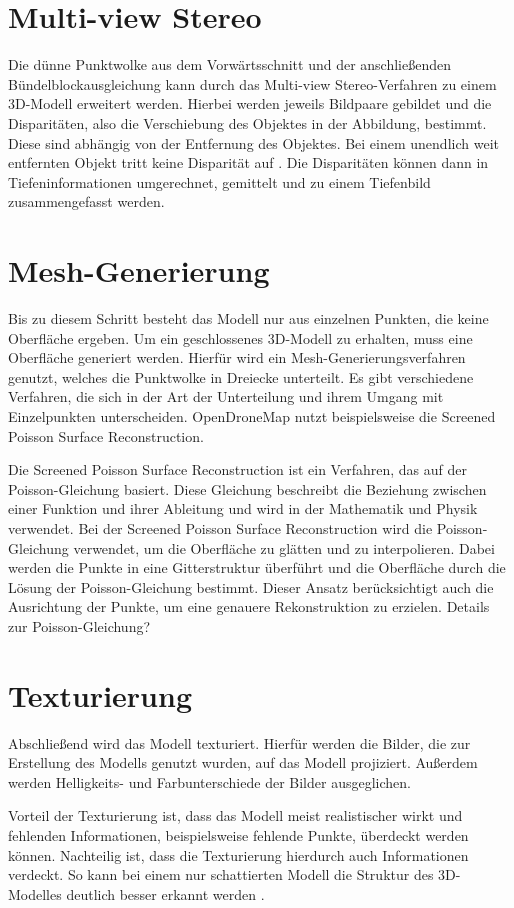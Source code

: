 \documentclass[./00PhotoBox.tex]{subfiles}
\begin{document}
\section{Multi-view Stereo}
Die dünne Punktwolke aus dem Vorwärtsschnitt und der anschließenden Bündel\-block\-ausgleichung kann durch das Multi-view Stereo-Verfahren zu einem 3D-Modell erweitert werden. Hierbei werden jeweils Bildpaare gebildet und die Disparitäten, also die Verschiebung des Objektes in der Abbildung, bestimmt. Diese sind abhängig von der Entfernung des Objektes. Bei einem unendlich weit entfernten Objekt tritt keine Disparität auf \citep[S. 313]{luhmann}. Die Disparitäten können dann in Tiefeninformationen umgerechnet, gemittelt und zu einem Tiefenbild zusammengefasst werden. \citep[S. 505]{luhmann}

\section{Mesh-Generierung}
Bis zu diesem Schritt besteht das Modell nur aus einzelnen Punkten, die keine Oberfläche ergeben. Um ein geschlossenes 3D-Modell zu erhalten, muss eine Oberfläche generiert werden. Hierfür wird ein Mesh-Generierungsverfahren genutzt, welches die Punktwolke in Dreiecke unterteilt. Es gibt verschiedene Verfahren, die sich in der Art der Unterteilung und ihrem Umgang mit Einzelpunkten unterscheiden. OpenDroneMap nutzt beispielsweise die Screened Poisson Surface Reconstruction. \citep[S. 52f]{opendronemap}

Die Screened Poisson Surface Reconstruction ist ein Verfahren, das auf der Poisson-Gleichung basiert. Diese Gleichung beschreibt die Beziehung zwischen einer Funktion und ihrer Ableitung und wird in der Mathematik und Physik verwendet. Bei der Screened Poisson Surface Reconstruction wird die Poisson-Gleichung verwendet, um die Oberfläche zu glätten und zu interpolieren. Dabei werden die Punkte in eine Gitterstruktur überführt und die Oberfläche durch die Lösung der Poisson-Gleichung bestimmt. Dieser Ansatz berücksichtigt auch die Ausrichtung der Punkte, um eine genauere Rekonstruktion zu erzielen. \citep{spsr}Details zur Poisson-Gleichung?

\section{Texturierung}
Abschließend wird das Modell texturiert. Hierfür werden die Bilder, die zur Erstellung des Modells genutzt wurden, auf das Modell projiziert. Außerdem werden Helligkeits- und Farbunterschiede der Bilder ausgeglichen. \citep[S. 54f]{opendronemap}

Vorteil der Texturierung ist, dass das Modell meist realistischer wirkt und fehlenden Informationen, beispielsweise fehlende Punkte, überdeckt werden können. Nachteilig ist, dass die Texturierung hierdurch auch Informationen verdeckt. So kann bei einem nur schattierten Modell die Struktur des 3D-Modelles deutlich besser erkannt werden \citep[S. 702]{luhmann}.

\biblio
\end{document}
